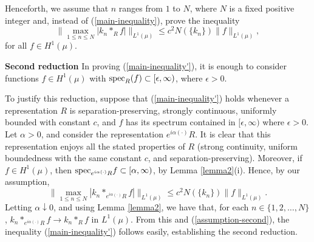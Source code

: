 Henceforth, we assume
that $n$ ranges from $1$ to $N$, where $N$ is a fixed positive
integer and, instead of (\ref{main-inequality}), 
prove the inequality
\begin{equation}
\|\max_{ 1\leq n\leq N} |k_n*_Rf|\|_{L^1(\mu)}\leq
c^2 N(\{k_n\}) \|f\|_{L^1(\mu)},
\label{main-inequality'}
\end{equation}
for all $f\in H^1(\mu)$.


{\bf Second reduction}  In proving (\ref{main-inequality'}), 
it is enough
to consider functions $f\in H^1(\mu)$ with
${\rm spec}_R (f)\subset [\epsilon,\infty)$, where $\epsilon >0$.

To justify this reduction, 
suppose that (\ref{main-inequality'})
holds whenever a representation $R$ 
is separation-preserving,
strongly continuous, uniformly bounded with constant $c$,
and $f$ has its spectrum contained in $[\epsilon,\infty)$ where
$\epsilon >0$.
Let $\alpha>0$, and consider the representation
$e^{i\alpha (\cdot )} R$.  It is clear that 
this representation enjoys all the stated properties of $R$
(strong continuity,  uniform boundedness with the 
same constant $c$, and separation-preserving).  
Moreover, if $f\in H^1(\mu)$,
then
${\rm spec}_{e^{i\alpha (\cdot )} R} f\subset [\alpha,\infty)$,
by Lemma \ref{lemma2}(i).
Hence, by our assumption,
\begin{equation}
\|\max_{1\leq n\leq N} 
|k_n*_{e^{i\alpha (\cdot )} R} f|\|_{L^1(\mu)}
\leq c^2 N(\{k_n\}) \|f\|_{L^1(\mu)}.
\label{assumption-second}
\end{equation}
Letting $\alpha\downarrow 0$, and using Lemma \ref{lemma2},
we have that,
for each $n\in \{1,2,\ldots, N\}$,
 $k_n*_{e^{i\alpha (\cdot )} R} f\rightarrow k_n*_R f$
in $L^1(\mu)$.  From this and (\ref{assumption-second}),
the inequality (\ref{main-inequality'})
follows easily, establishing the second reduction.

